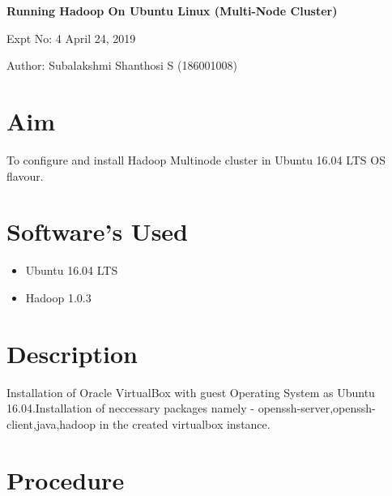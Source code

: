 \documentclass[a4paper,10pt]{article}
\begin{document}
\setcounter{secnumdepth}{-1} 

\begin{center}
\textbf{\LARGE Running Hadoop On Ubuntu Linux (Multi-Node Cluster)}
\end{center}

\raggedright Expt No: 4 \hfill \raggedleft April  24, 2019 \\ 

\raggedright Author: Subalakshmi Shanthosi S  (186001008) \par 

\noindent\makebox[\linewidth]{\rule{\textwidth}{1pt}} 

\section{Aim}
To configure and install  Hadoop Multinode cluster in Ubuntu 16.04 LTS OS flavour.

\section{Software's Used}
\begin{itemize}
  \item Ubuntu  16.04 LTS
  \item Hadoop 1.0.3
\end{itemize}

\section{Description}
Installation of Oracle VirtualBox with guest Operating System as Ubuntu 16.04.Installation of neccessary packages namely - openssh-server,openssh-client,java,hadoop in the created virtualbox instance.
\section{Procedure}
\end{document}
